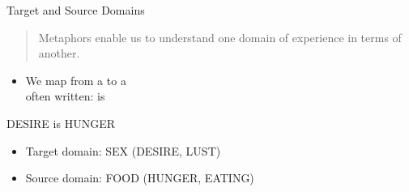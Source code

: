 \begin{frame}{Target and Source Domains}

\begin{quote}
 Metaphors enable us to understand one
  domain of experience in terms of another.
\hfill \citet{Lakoff:Turner:1989}
\end{quote}

\begin{itemize}
\item We map from a  to a 
\\[1.5ex] often written:  is 
\end{itemize}




\end{frame}

\begin{frame}{DESIRE is HUNGER}

\begin{exe}
  \ex {}  
  \ex {}
  \ex {} 
  \ex {}
  \ex {}
\end{exe}
\begin{itemize}
\item Target domain: SEX (DESIRE, LUST)
\item Source domain: FOOD (HUNGER, EATING)
\end{itemize}


\end{frame}

